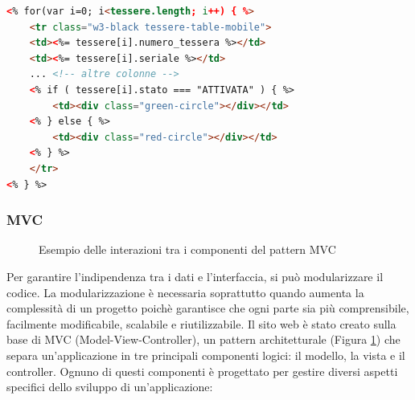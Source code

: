 \documentclass[12pt]{report}
\begin{document}
\pagebreak

\begin{lstlisting}[language=HTML, morekeywords={if, else}, caption={Uso di \emph{EJS} nel lato client. Il codice JavaScript all'interno della pagina HTML è racchiuso tra \textquotedblleft{} $<$\% \%$>$ \textquotedblright{} e l'oggetto \textquotedblleft{} tessere \textquotedblright{} è stato passato dal server in formato JSON. Gli oggetti passati dal server sono racchiusi tra \textquotedblleft{} $<$\%= \%$>$ \textquotedblright{} }, label={lst:ejs_client}]
<% for(var i=0; i<tessere.length; i++) { %>
	<tr class="w3-black tessere-table-mobile">
	<td><%= tessere[i].numero_tessera %></td>
	<td><%= tessere[i].seriale %></td>
	... <!-- altre colonne -->
	<% if ( tessere[i].stato === "ATTIVATA" ) { %>
		<td><div class="green-circle"></div></td>
	<% } else { %>
		<td><div class="red-circle"></div></td>
	<% } %>
	</tr>
<% } %>
\end{lstlisting}

\subsubsection*{MVC}

\begin{figure}[H]
	\caption{Esempio delle interazioni tra i componenti del pattern MVC}
	\label{fig:mvc}
\end{figure}

Per garantire l'indipendenza tra i dati e l'interfaccia, si può modularizzare il codice. La modularizzazione è necessaria soprattutto quando aumenta la complessità di un progetto poichè garantisce che ogni parte sia più comprensibile, facilmente modificabile, scalabile e riutilizzabile.
Il sito web è stato creato sulla base di MVC (Model-View-Controller), un pattern architetturale (Figura \ref{fig:mvc}) che separa un'applicazione in tre principali componenti logici: il modello, la vista e il controller. Ognuno di questi componenti è progettato per gestire diversi aspetti specifici dello sviluppo di un'applicazione:
\end{document}
